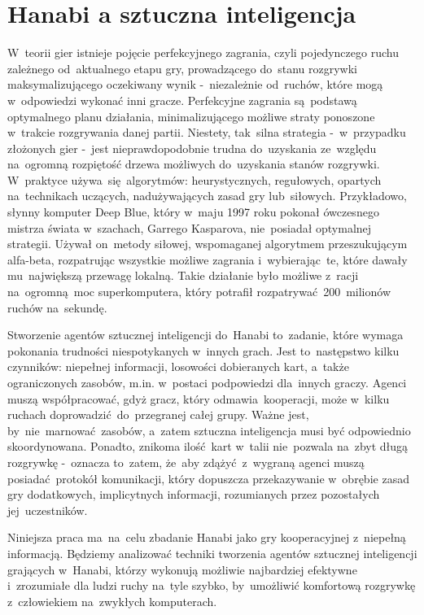 \documentclass[declaration,shortabstract,inz]{iithesis}
\begin{document}
\section{Hanabi a sztuczna inteligencja}

W~teorii gier istnieje pojęcie perfekcyjnego zagrania, czyli pojedynczego ruchu zależnego od~aktualnego etapu gry, prowadzącego do~stanu rozgrywki maksymalizującego oczekiwany wynik -~niezależnie od~ruchów, które mogą w~odpowiedzi wykonać inni gracze. Perfekcyjne zagrania są~podstawą optymalnego planu działania, minimalizującego możliwe straty ponoszone w~trakcie rozgrywania danej partii. Niestety, tak~silna strategia -~w~przypadku złożonych gier -~jest nieprawdopodobnie trudna do~uzyskania ze~względu na~ogromną rozpiętość drzewa możliwych do~uzyskania stanów rozgrywki. W~praktyce używa~się algorytmów: heurystycznych, regułowych, opartych na~technikach uczących, nadużywających zasad gry lub~siłowych. Przykładowo, słynny komputer Deep Blue, który w~maju 1997 roku pokonał ówczesnego mistrza świata w~szachach, Garrego Kasparova, nie~posiadał optymalnej strategii. Używał on~metody siłowej, wspomaganej algorytmem przeszukującym alfa-beta, rozpatrując wszystkie możliwe zagrania i~wybierając~te, które dawały mu~największą przewagę lokalną. Takie działanie było możliwe z~racji na~ogromną moc superkomputera, który potrafił rozpatrywać 200~milionów ruchów na~sekundę.

Stworzenie agentów sztucznej inteligencji do~Hanabi to~zadanie, które wymaga pokonania trudności niespotykanych w~innych grach. Jest to~następstwo kilku czynników: niepełnej informacji, losowości dobieranych kart, a~także ograniczonych zasobów, m.in. w~postaci podpowiedzi dla~innych graczy. Agenci muszą współpracować, gdyż gracz, który odmawia~kooperacji, może w~kilku ruchach doprowadzić do~przegranej całej grupy. Ważne jest, by~nie~marnować zasobów, a~zatem sztuczna inteligencja musi być odpowiednio skoordynowana. Ponadto, znikoma ilość kart w~talii nie~pozwala na~zbyt długą rozgrywkę -~oznacza to~zatem, że~aby zdążyć z~wygraną agenci muszą posiadać protokół komunikacji, który dopuszcza przekazywanie w~obrębie zasad gry dodatkowych, implicytnych informacji, rozumianych przez pozostałych jej~uczestników.

Niniejsza praca ma~na~celu zbadanie Hanabi jako gry kooperacyjnej z~niepełną informacją. Będziemy analizować techniki tworzenia agentów sztucznej inteligencji grających w~Hanabi, którzy wykonują możliwie najbardziej efektywne i~zrozumiałe dla ludzi ruchy na~tyle szybko, by~umożliwić komfortową rozgrywkę z~człowiekiem na~zwykłych komputerach.
\end{document}
